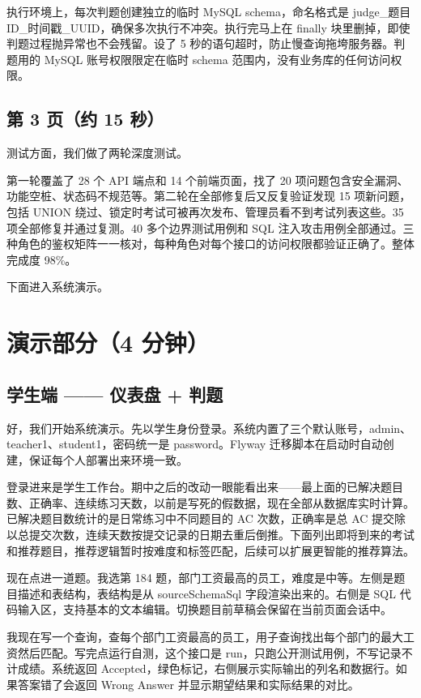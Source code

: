 \documentclass[12pt,a4paper]{article}
\begin{document}
执行环境上，每次判题创建独立的临时 MySQL schema，命名格式是 judge\_题目ID\_时间戳\_UUID，确保多次执行不冲突。执行完马上在 finally 块里删掉，即使判题过程抛异常也不会残留。设了 5 秒的语句超时，防止慢查询拖垮服务器。判题用的 MySQL 账号权限限定在临时 schema 范围内，没有业务库的任何访问权限。

\subsection*{第 3 页（约 15 秒）}

测试方面，我们做了两轮深度测试。

第一轮覆盖了 28 个 API 端点和 14 个前端页面，找了 20 项问题包含安全漏洞、功能空桩、状态码不规范等。第二轮在全部修复后又反复验证发现 15 项新问题，包括 UNION 绕过、锁定时考试可被再次发布、管理员看不到考试列表这些。35 项全部修复并通过复测。40 多个边界测试用例和 SQL 注入攻击用例全部通过。三种角色的鉴权矩阵一一核对，每种角色对每个接口的访问权限都验证正确了。整体完成度 98\%。

下面进入系统演示。

\section*{演示部分（4 分钟）}

\subsection*{学生端 —— 仪表盘 + 判题}

好，我们开始系统演示。先以学生身份登录。系统内置了三个默认账号，admin、teacher1、student1，密码统一是 password。Flyway 迁移脚本在启动时自动创建，保证每个人部署出来环境一致。

登录进来是学生工作台。期中之后的改动一眼能看出来——最上面的已解决题目数、正确率、连续练习天数，以前是写死的假数据，现在全部从数据库实时计算。已解决题目数统计的是日常练习中不同题目的 AC 次数，正确率是总 AC 提交除以总提交次数，连续天数按提交记录的日期去重后倒推。下面列出即将到来的考试和推荐题目，推荐逻辑暂时按难度和标签匹配，后续可以扩展更智能的推荐算法。

现在点进一道题。我选第 184 题，部门工资最高的员工，难度是中等。左侧是题目描述和表结构，表结构是从 sourceSchemaSql 字段渲染出来的。右侧是 SQL 代码输入区，支持基本的文本编辑。切换题目前草稿会保留在当前页面会话中。

我现在写一个查询，查每个部门工资最高的员工，用子查询找出每个部门的最大工资然后匹配。写完点运行自测，这个接口是 run，只跑公开测试用例，不写记录不计成绩。系统返回 Accepted，绿色标记，右侧展示实际输出的列名和数据行。如果答案错了会返回 Wrong Answer 并显示期望结果和实际结果的对比。
\end{document}
